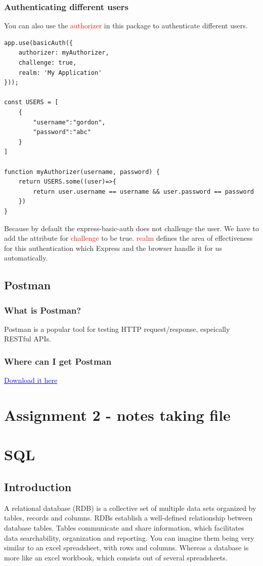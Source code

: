 \documentclass[a4paper]{article}
\begin{document}
\subsubsection{Authenticating different users}
You can also use the \textcolor{red}{authorizer} in this package to authenticate different users.
\begin{lstlisting}
app.use(basicAuth({
    authorizer: myAuthorizer,
    challenge: true,
    realm: 'My Application'
}));

const USERS = [
    {
        "username":"gordon",
        "password":"abc"
    }
]

function myAuthorizer(username, password) {
    return USERS.some((user)=>{
        return user.username == username && user.password == password
    })
}
\end{lstlisting}
Because by default the express-basic-auth does not challenge the user. We have to add the attribute for \textcolor{red}{challenge} to be true. \textcolor{red}{realm} defines the area of effectiveness for this authentication which Express and the browser handle it for us automatically.
\subsection{Postman}
\subsubsection{What is Postman?}
Postman is a popular tool for testing HTTP request/response, espeically RESTful APIs. 
\subsubsection{Where can I get Postman}
\href{https://www.getpostman.com/postman}{\textcolor{blue}{Download it here}}


\section{Assignment 2 - notes taking file}

\section{SQL}
\subsection{Introduction}
A relational database (RDB) is a collective set of multiple data sets organized by tables, records and columns. RDBs establish a well-defined relationship between database tables. Tables communicate and share information, which facilitates data searchability, organization and reporting. You can imagine them being very similar to an excel spreadsheet, with rows and columns. Whereas a database is more like an excel workbook, which consists out of several spreadsheets.\\
\end{document}
